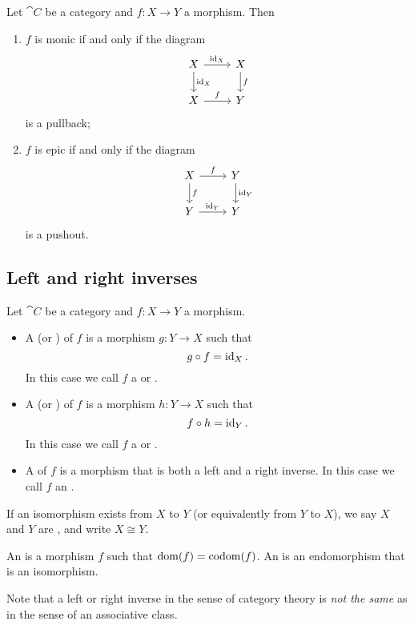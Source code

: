 \begin{proposition}
Let $\cat{C}$ be a category and $f: X\to Y$ a morphism. Then
\begin{enumerate}
\item $f$ is monic \textup{if and only if} the diagram
\[ \begin{tikzcd}
X \ar[r, "\id_X"] \ar[d, "\id_X"] & X \ar[d, "f"] \\
X \ar[r, "f"] & Y
\end{tikzcd} \]
is a pullback;
\item $f$ is epic \textup{if and only if} the diagram
\[ \begin{tikzcd}
X \ar[r, "f"] \ar[d, "f"] & Y \ar[d, "\id_Y"] \\
Y \ar[r, "\id_Y"] & Y
\end{tikzcd} \]
is a pushout.
\end{enumerate}
\end{proposition}

\subsection{Left and right inverses}
\begin{definition}
Let $\cat{C}$ be a category and $f:X\to Y$ a morphism.
\begin{itemize}
\item A  (or ) of $f$ is a morphism $g: Y\to X$ such that
\[ g\circ f = \operatorname{id}_X. \]
In this case we call $f$ a  or .
\item A  (or ) of $f$ is a morphism $h: Y\to X$ such that
\[ f\circ h = \operatorname{id}_Y. \]
In this case we call $f$ a  or .
\item A  of $f$ is a morphism that is both a left and a right inverse. In this case we call $f$ an .
\end{itemize}
If an isomorphism exists from $X$ to $Y$ (or equivalently from $Y$ to $X$), we say $X$ and $Y$ are , and write $X\cong Y$.
\end{definition}

An  is a morphism $f$ such that $\operatorname{dom}(f) = \operatorname{codom}(f)$. An  is an endomorphism that is an isomorphism.

Note that a left or right inverse in the sense of category theory is \emph{not the same} as in the sense of an associative class.

